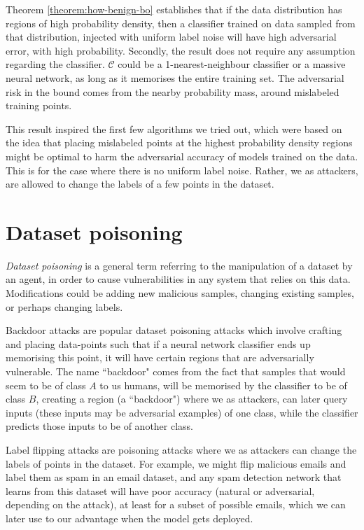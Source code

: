 \documentclass{ociamthesis}
\begin{document}
Theorem \ref{theorem:how-benign-bo} establishes that if the data distribution
has regions of high probability density, then a classifier trained on data
sampled from that distribution, injected with uniform label noise will have high
adversarial error, with high probability. Secondly, the result does not require
any assumption regarding the classifier. $\mathcal{C}$ could be a
1-nearest-neighbour classifier or a massive neural network, as long as it
memorises the entire training set. The adversarial risk in the bound comes from
the nearby probability mass, around mislabeled training points.


This result inspired the first few algorithms we tried out, which were based on
the idea that placing mislabeled points at the highest probability density
regions might be optimal to harm the adversarial accuracy of models trained on
the data. This is for the case where there is no uniform label noise. Rather, we
as attackers, are allowed to change the labels of a few points in the dataset.


\section{Dataset poisoning}
\emph{Dataset poisoning} \citep{just-how-toxic,
DBLP:journals/corr/abs-1712-05526} is a general term referring to the
manipulation of a dataset by an agent, in order to cause vulnerabilities in any
system that relies on this data. Modifications could be adding new malicious
samples, changing existing samples, or perhaps changing labels.

Backdoor attacks
\citep{DBLP:journals/corr/abs-1712-05526,hidden-trigger-backdoor,transferable-clean-label-poisoning}
are popular dataset poisoning attacks which involve crafting and placing
data-points such that if a neural network classifier ends up memorising this
point, it will have certain regions that are adversarially vulnerable. The name
``backdoor" comes from the fact that samples that would seem to be of class $A$
to us humans, will be memorised by the classifier to be of class $B$, creating a
region (a ``backdoor") where we as attackers, can later query inputs (these
inputs may be adversarial examples) of one class, while the classifier predicts
those inputs to be of another class.

Label flipping attacks \citep{label-flip-SVMs,certified-robustness} are
poisoning attacks where we as attackers can change the labels of points in the
dataset. For example, we might flip malicious emails and label them as spam in
an email dataset, and any spam detection network that learns from this dataset
will have poor accuracy (natural or adversarial, depending on the attack), at
least for a subset of possible emails, which we can later use to our advantage
when the model gets deployed.
\end{document}

